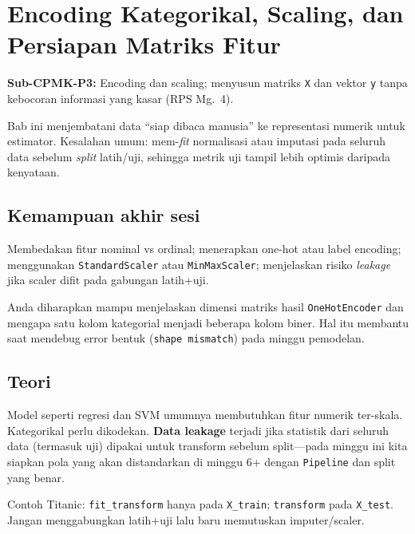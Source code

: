 \documentclass[../main.tex]{subfiles}
\begin{document}
\chapter{Encoding Kategorikal, Scaling, dan Persiapan Matriks Fitur}

\begin{subcpmk}
  \item \textbf{Sub-CPMK-P3:} Encoding dan scaling; menyusun matriks \texttt{X} dan vektor \texttt{y} tanpa kebocoran informasi yang kasar (RPS Mg.\ 4).
\end{subcpmk}


\noindent Bab ini menjembatani data ``siap dibaca manusia'' ke representasi numerik untuk estimator. Kesalahan umum: mem-\textit{fit} normalisasi atau imputasi pada seluruh data sebelum \textit{split} latih/uji, sehingga metrik uji tampil lebih optimis daripada kenyataan.

\section{Kemampuan akhir sesi}

Membedakan fitur nominal vs ordinal; menerapkan one-hot atau label encoding; menggunakan \texttt{StandardScaler} atau \texttt{MinMaxScaler}; menjelaskan risiko \textit{leakage} jika scaler difit pada gabungan latih+uji.

Anda diharapkan mampu menjelaskan dimensi matriks hasil \texttt{OneHotEncoder} dan mengapa satu kolom kategorial menjadi beberapa kolom biner. Hal itu membantu saat mendebug error bentuk (\texttt{shape mismatch}) pada minggu pemodelan.

\section{Teori}

\begin{konsep}
Model seperti regresi dan SVM umumnya membutuhkan fitur numerik ter-skala. Kategorikal perlu dikodekan. \textbf{Data leakage} terjadi jika statistik dari seluruh data (termasuk uji) dipakai untuk transform sebelum split---pada minggu ini kita siapkan pola yang akan distandarkan di minggu 6+ dengan \texttt{Pipeline} dan split yang benar.
\end{konsep}

\begin{catatan}
Contoh Titanic: \texttt{fit\_transform} hanya pada \texttt{X\_train}; \texttt{transform} pada \texttt{X\_test}. Jangan menggabungkan latih+uji lalu baru memutuskan imputer/scaler.
\end{catatan}
\end{document}
